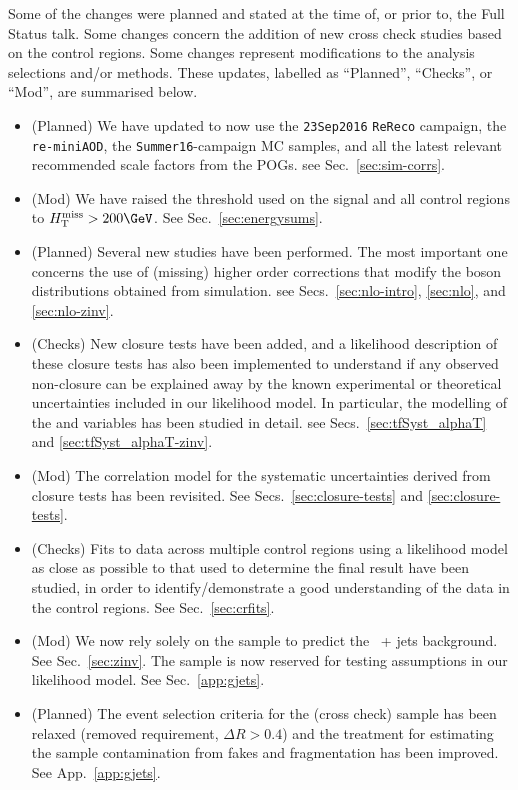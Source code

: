 Some of the changes were planned and stated at the time of, or prior
to, the Full Status talk. Some changes concern the addition of new
cross check studies based on the control regions. Some changes
represent modifications to the analysis selections and/or
methods. These updates, labelled as ``Planned'', ``Checks'', or
``Mod'', are summarised below.
  
\begin{itemize}
  
\item (Planned) We have updated to now use the \verb!23Sep2016!
  \verb!ReReco! campaign, the \verb!re-miniAOD!, the
  \verb!Summer16!-campaign MC samples, and all the latest relevant
  recommended scale factors from the POGs. \eg see
  Sec.~\ref{sec:sim-corrs}.
  
\item (Mod) We have raised the \HTmiss threshold used on the signal
  and all control regions to $\HTmiss > 200\GeV$. See
  Sec.~\ref{sec:energysums}. 
    
\item (Planned) Several new studies have been performed. The most
  important one concerns the use of (missing) higher order corrections
  that modify the boson \Pt distributions obtained from
  simulation. \eg see Secs.~\ref{sec:nlo-intro}, \ref{sec:nlo}, and
  \ref{sec:nlo-zinv}.

\item (Checks) New closure tests have been added, and a likelihood
  description of these closure tests has also been implemented to
  understand if any observed non-closure can be explained away by the
  known experimental or theoretical uncertainties included in our
  likelihood model. In particular, the modelling of the \alphat and
  \bdphi variables has been studied in detail. \eg see
  Secs.~\ref{sec:tfSyst_alphaT} and \ref{sec:tfSyst_alphaT-zinv}.

\item (Mod) The correlation model for the systematic uncertainties
  derived from closure tests has been revisited. See
  Secs.~\ref{sec:closure-tests} and \ref{sec:closure-tests}.

\item (Checks) Fits to data across multiple control regions using a
  likelihood model as close as possible to that used to determine the
  final result have been studied, in order to identify/demonstrate a
  good understanding of the data in the control regions. See
  Sec.~\ref{sec:crfits}.

\item (Mod) We now rely solely on the \mmj sample to predict the
  \znunu\ + jets background. See Sec.~\ref{sec:zinv}. The \gj sample
  is now reserved for testing assumptions in our likelihood model. See
  Sec.~\ref{app:gjets}.

\item (Planned) The event selection criteria for the \gj (cross check)
  sample has been relaxed (removed \alphat requirement, $\Delta R >
  0.4$) and the treatment for estimating the sample contamination from
  fakes and fragmentation has been improved. See App.~\ref{app:gjets}.

\end{itemize}

